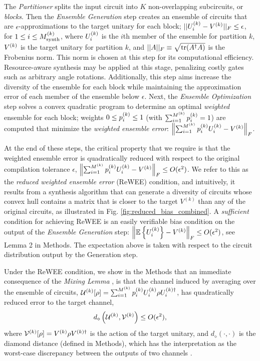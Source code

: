 The \emph{Partitioner} splits the input circuit into $K$ non-overlapping subcircuits, or \emph{blocks}. Then the \emph{Ensemble Generation} step creates an ensemble of circuits that are $\epsilon$-approximations to the target unitary for each block; \ie $||U^{(k)}_i - V^{(k)}||_F \leq \epsilon$, for $1\leq i \leq M^{(k)}_{\rm synth}$, where $U^{(k)}_i$ is the $i$th member of the ensemble for partition $k$, $V^{(k)}$ is the target unitary for partition $k$, and $||A||_F \equiv \sqrt{{\rm tr}(A^\dagger A)}$ is the Frobenius norm. This norm is chosen at this step for its computational efficiency. Resource-aware
synthesis may be applied at this stage, \eg penalizing costly gates
such as arbitrary angle rotations. Additionally, this step aims increase the diversity of the ensemble for each block while maintaining the approximation error of each member of the ensemble below $\epsilon$. Next, the \emph{Ensemble Optimization} step solves a convex quadratic program to determine an optimal \emph{weighted} ensemble for each block; \ie weights $0 \leq p^{(k)}_i \leq 1$ (with $\sum_{i=1}^{M^{(k)}} p^{(k)}_i = 1$) are computed that minimize the \emph{weighted ensemble error}: $\left\lVert \sum_{i=1}^{M^{(k)}} p^{(k)}_i U^{(k)}_i - V^{(k)} \right\rVert_F$. 

At the end of these steps, the critical property that we require is that the weighted ensemble error is quadratically reduced with respect to the original compilation tolerance $\epsilon$, \ie $\left\lVert \sum_{i=1}^{M^{(k)}}p^{(k)}_i U^{(k)}_i - V^{(k)} \right\rVert_F \leq O(\epsilon^2)$. We refer to this as the \emph{reduced weighted ensemble error} (ReWEE) condition, and intuitively, it results from a synthesis algorithm that can generate a diversity of circuits whose convex hull contains a matrix that is closer to the target $V^{(k)}$ than any of the original circuits, as illustrated in Fig. \ref{fig:reduced_bias_combined}. A \emph{sufficient} condition for achieving ReWEE is an easily verifiable bias condition on the output of the \emph{Ensemble Generation} step: $\left\lVert \mathbb{E}\left\{ U_i^{(k)} \right\}-V^{(k)} \right\rVert_F \leq O(\epsilon^2)$, see Lemma 2 in Methods. The expectation above is taken with respect to the circuit distribution output by the Generation step.

Under the ReWEE condition, we show in the Methods that an immediate consequence of the \emph{Mixing Lemma} \cite{PhysRevA.95.042306,hastings2016turning}, is that the channel induced by averaging over the ensemble of circuits, $\mathcal{U}^{(k)}[\rho] = \sum_{i=1}^{M^{(k)}} p^{(k)}_i U^{(k)}_i \rho U_i^{(k)\dagger}$, has quadratically reduced error to the target channel, 
\begin{align}
    d_{\diamond}\left(\mathcal{U}^{(k)}, \mathcal{V}^{(k)}\right) \leq O(\epsilon^2),
    \label{eq:diamond_bound}
\end{align} 
where $\mathcal{V}^{(k)}[\rho] = V^{(k)} \rho V^{(k)\dagger}$ is the action of the target unitary, and $d_\diamond(\cdot,\cdot)$ is the diamond distance (defined in Methods), which has the interpretation as the worst-case discrepancy between the outputs of two channels \cite{watrous_2018}. 

